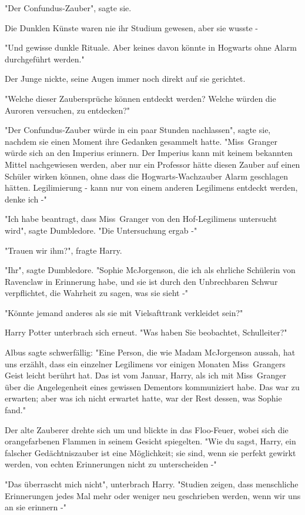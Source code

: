 {"Der Confundus-Zauber", sagte sie.

Die Dunklen Künste waren nie ihr Studium gewesen, aber sie wusste -

"Und gewisse dunkle Rituale. Aber keines davon könnte in Hogwarts ohne Alarm durchgeführt werden."

Der Junge nickte, seine Augen immer noch direkt auf sie gerichtet.

"Welche dieser Zaubersprüche können entdeckt werden? Welche würden die Auroren versuchen, zu entdecken?"

"Der Confundus-Zauber würde in ein paar Stunden nachlassen", sagte sie, nachdem sie einen Moment ihre Gedanken gesammelt hatte. "Miss~Granger würde sich an den Imperius erinnern. Der Imperius kann mit keinem bekannten Mittel nachgewiesen werden, aber nur ein Professor hätte diesen Zauber auf einen Schüler wirken können, ohne dass die Hogwarts-Wachzauber Alarm geschlagen hätten. Legilimierung - kann nur von einem anderen Legilimens entdeckt werden, denke ich -"

"Ich habe beantragt, dass Miss~Granger von den Hof-Legilimens untersucht wird", sagte Dumbledore. "Die Untersuchung ergab -"

"Trauen wir ihm?", fragte Harry.

"Ihr", sagte Dumbledore. "Sophie McJorgenson, die ich als ehrliche Schülerin von Ravenclaw in Erinnerung habe, und sie ist durch den Unbrechbaren Schwur verpflichtet, die Wahrheit zu sagen, was sie sieht -"

"Könnte jemand anderes als sie mit Vielsafttrank verkleidet sein?"

Harry Potter unterbrach sich erneut. "Was haben Sie beobachtet, Schulleiter?"

Albus sagte schwerfällig: "Eine Person, die wie Madam McJorgenson aussah, hat uns erzählt, dass ein einzelner Legilimens vor einigen Monaten Miss~Grangers Geist leicht berührt hat. Das ist vom Januar, Harry, als ich mit Miss~Granger über die Angelegenheit eines gewissen Dementors kommuniziert habe. Das war zu erwarten; aber was ich nicht erwartet hatte, war der Rest dessen, was Sophie fand."

Der alte Zauberer drehte sich um und blickte in das Floo-Feuer, wobei sich die orangefarbenen Flammen in seinem Gesicht spiegelten. "Wie du sagst, Harry, ein falscher Gedächtniszauber ist eine Möglichkeit; sie sind, wenn sie perfekt gewirkt werden, von echten Erinnerungen nicht zu unterscheiden -"

"Das überrascht mich nicht", unterbrach Harry. "Studien zeigen, dass menschliche Erinnerungen jedes Mal mehr oder weniger neu geschrieben werden, wenn wir uns an sie erinnern -"

}
